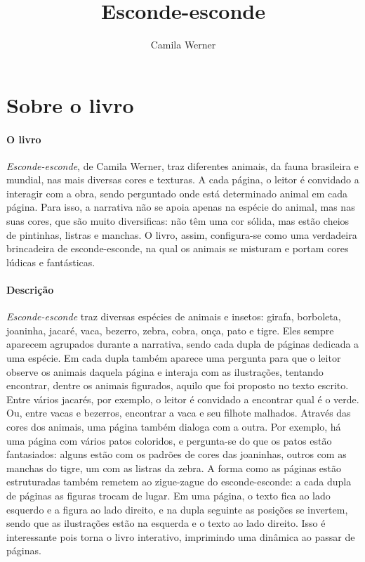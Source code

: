 \documentclass[11pt]{extarticle}
\newcommand{\AutorLivro}{Camila Werner}
\newcommand{\TituloLivro}{Esconde-esconde}
\newcommand{\colaborador}{Paulo Pompermaier e Renier Silva}
\begin{document}
\title{\TituloLivro}
\author{\AutorLivro}
\def\authornotes{\colaborador}

\date{}
\maketitle


\tableofcontents



\section{Sobre o livro}

\paragraph{O livro} \textit{Esconde-esconde}, de Camila Werner, traz diferentes animais, da fauna brasileira e mundial, nas mais diversas cores e texturas. A cada página, o leitor é convidado a interagir com a obra, sendo perguntado onde está determinado animal em cada página. Para isso, a narrativa não se apoia apenas na espécie do animal, mas nas suas cores, que são muito diversificas: não têm uma cor sólida, mas estão cheios de pintinhas, listras e manchas. O livro, assim, configura-se como uma verdadeira brincadeira de esconde-esconde, na qual os animais se misturam e portam cores lúdicas e fantásticas.


\paragraph{Descrição} \textit{Esconde-esconde} traz diversas espécies de animais e insetos: girafa, borboleta, joaninha, jacaré, vaca, bezerro, zebra, cobra, onça, pato e tigre. Eles sempre aparecem agrupados durante a narrativa, sendo cada dupla de páginas dedicada a uma espécie. Em cada dupla também aparece uma pergunta para que o leitor observe os animais daquela página e interaja com as ilustrações, tentando encontrar, dentre os animais figurados, aquilo que foi proposto no texto escrito. Entre vários jacarés, por exemplo, o leitor é convidado a encontrar qual é o verde. Ou, entre vacas e bezerros, encontrar a vaca e seu filhote malhados. Através das cores dos animais, uma página também dialoga com a outra.
Por exemplo, há uma página com vários patos coloridos, e pergunta-se do que os patos estão fantasiados: alguns estão com os padrões de cores das joaninhas, outros com as manchas do tigre, um com as listras da zebra. 
A forma como as páginas estão estruturadas também remetem ao zigue-zague do esconde-esconde: a cada dupla de páginas as figuras trocam de lugar. Em uma página, o texto fica ao lado esquerdo e a figura ao lado direito, e na dupla seguinte as posições se invertem, sendo que as ilustrações estão na esquerda e o texto ao lado direito. Isso é interessante pois torna o livro interativo, imprimindo uma dinâmica ao passar de páginas.
\end{document}
